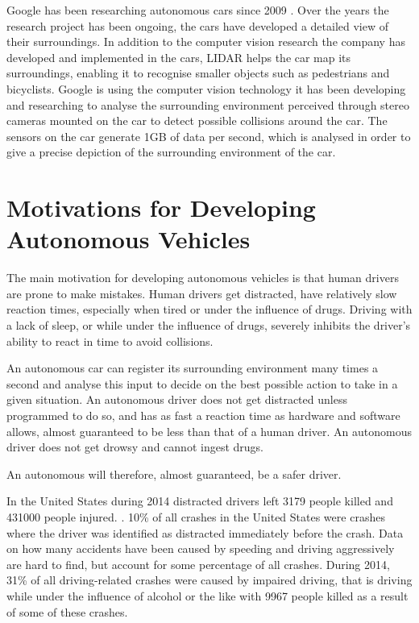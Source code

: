 Google has been researching autonomous cars since 2009 \cite{googlecars}. Over the years the research project has been ongoing, the cars have developed a detailed view of their surroundings. In addition to the computer vision research the company has developed and implemented in the cars, LIDAR helps the car map its surroundings, enabling it to recognise smaller objects such as pedestrians and bicyclists. Google is using the computer vision technology it has been developing and researching to analyse the surrounding environment perceived through stereo cameras mounted on the car to detect possible collisions around the car. The sensors on the car generate 1GB of data per second\cite{datagathering}, which is analysed in order to give a precise depiction of the surrounding environment of the car. 

\section{Motivations for Developing Autonomous Vehicles}
The main motivation for developing autonomous vehicles is that human drivers are prone to make mistakes. Human drivers get distracted, have relatively slow reaction times, especially when tired or under the influence of drugs. Driving with a lack of sleep, or while under the influence of drugs, severely inhibits the driver's ability to react in time to avoid collisions. 

An autonomous car can register its surrounding environment many times a second and analyse this input to decide on the best possible action to take in a given situation. An autonomous driver does not get distracted unless programmed to do so, and has as fast a reaction time as hardware and software allows, almost guaranteed to be less than that of a human driver. An autonomous driver does not get drowsy and cannot ingest drugs. 

An autonomous will therefore, almost guaranteed, be a safer driver. 

\newpar In the United States during 2014 distracted drivers left 3179 people killed and 431000 people injured. \cite{distracteddriving}. 10\% of all crashes in the United States were crashes where the driver was identified as distracted immediately before the crash. Data on how many accidents have been caused by speeding and driving aggressively are hard to find, but account for some percentage of all crashes. 
During 2014, 31\% of all driving-related crashes were caused by impaired driving, that is driving while under the influence of alcohol or the like with 9967 people killed as a result of some of these crashes. \cite{impaireddriving}

